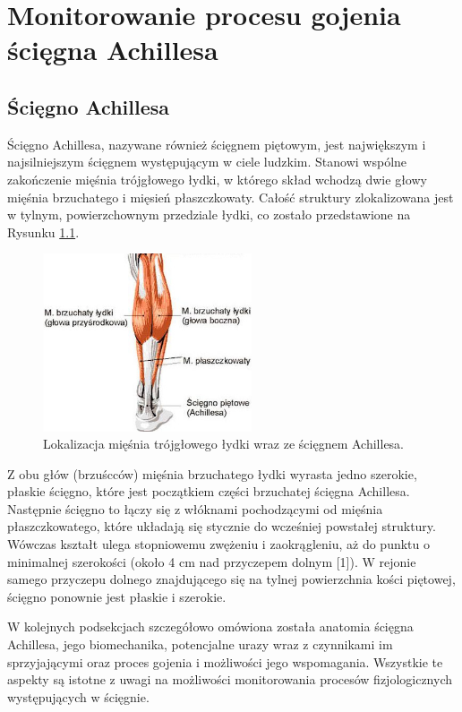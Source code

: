 \chapter{Monitorowanie procesu gojenia ścięgna Achillesa}
\section{Ścięgno Achillesa}
Ścięgno Achillesa, nazywane również ścięgnem piętowym, jest największym i najsilniejszym ścięgnem występującym w ciele ludzkim. Stanowi wspólne zakończenie mięśnia trójgłowego łydki, w którego skład wchodzą dwie głowy mięśnia brzuchatego i mięsień płaszczkowaty. Całość struktury zlokalizowana jest w tylnym, powierzchownym przedziale łydki, co zostało przedstawione na Rysunku \ref{muscle_structure}.  
\begin{figure}[h!]
\centering
\includegraphics[width=0.55\textwidth]{figures/muscleStructure.jpg}
\caption{Lokalizacja mięśnia trójgłowego łydki wraz ze ścięgnem Achillesa.}
\label{muscle_structure}
\end{figure}
Z obu głów (brzuścców) mięśnia brzuchatego łydki wyrasta jedno szerokie, płaskie ścięgno, które jest początkiem części brzuchatej ścięgna Achillesa. Następnie ścięgno to łączy się z włóknami pochodzącymi od mięśnia płaszczkowatego, które układają się stycznie do wcześniej powstałej struktury. Wówczas kształt ulega stopniowemu zwężeniu i zaokrągleniu, aż do punktu o minimalnej szerokości (około 4 cm nad przyczepem dolnym [1]). W rejonie samego przyczepu dolnego znajdującego się na tylnej powierzchnia kości piętowej, ścięgno ponownie jest płaskie i szerokie.

W kolejnych podsekcjach szczegółowo omówiona została anatomia ścięgna Achillesa, jego biomechanika, potencjalne urazy wraz z czynnikami im sprzyjającymi oraz proces gojenia i możliwości jego wspomagania. Wszystkie te aspekty są istotne z uwagi na możliwości monitorowania procesów fizjologicznych występujących w ścięgnie. 
